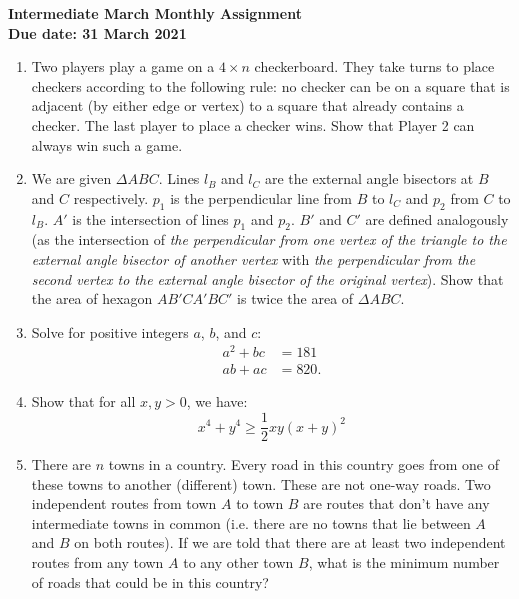 \documentclass{article}
\begin{document}
\thispagestyle{empty}

\begin{center}
  \textbf{\Large Intermediate March Monthly Assignment}
  \\ \vspace{1em}
  \textbf{\large Due date: 31 March 2021}
\end{center}

\vfill
\vfill

\begin{enumerate}[1.]

\vfill
\item %
Two players play a game on a ${4\times n}$ checkerboard. They take turns to place checkers according to the following rule: no checker can be on a square that is adjacent (by either edge or vertex) to a square that already contains a checker. The last player to place a checker wins. Show that Player 2 can always win such a game.


\vfill
\item %
We are given ${\Delta ABC}$. Lines ${l_B}$ and ${l_C}$ are the external angle bisectors at ${B}$ and ${C}$ respectively. ${p_1}$ is the perpendicular line from ${B}$ to ${l_C}$ and ${p_2}$ from ${C}$ to ${l_B}$. ${A'}$ is the intersection of lines ${p_1}$ and ${p_2}$. ${B'}$ and ${C'}$ are defined analogously (as the intersection of \emph{the perpendicular from one vertex of the triangle to the external angle bisector of another vertex} with \emph{the perpendicular from the second vertex to the external angle bisector of the original vertex}). Show that the area of hexagon ${AB'CA'BC'}$ is twice the area of ${\Delta ABC}$.


\vfill
\item %
Solve for positive integers $a$, $b$, and $c$:
\begin{align*}
a^2 + bc &= 181\\
ab + ac &= 820.
\end{align*}


\vfill
\item %
Show that for all $x,y > 0$, we have:
$$ x^4 + y^4 \geq \frac{1}{2} xy (x+y)^2 $$


\vfill
\item %
There are $n$ towns in a country.
Every road in this country goes from one of these towns to another (different) town. These are not one-way roads.
Two independent routes from town $A$ to town $B$ are routes that don't have any intermediate towns in common (i.e. there are no towns that lie between $A$ and $B$ on both routes).
If we are told that there are at least two independent routes from any town $A$ to any other town $B$, what is the minimum number of roads that could be in this country?



\end{enumerate}
\end{document}
